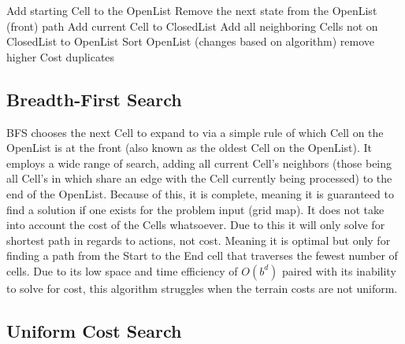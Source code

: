 \documentclass[conference]{IEEEtran}
\begin{document}
\begin{algorithm}
\caption{General Search Outline}
\begin{algorithmic}[1]
\State Add starting Cell to the OpenList
    \State Remove the next state from the OpenList (front)
        \State \Return path
    \Else
        \State Add current Cell to ClosedList
        \State Add all neighboring Cells not on ClosedList to OpenList
    \EndIf
        \State Sort OpenList (changes based on algorithm)
        \State remove higher Cost duplicates
    \EndIf
\EndWhile
\end{algorithmic}
\end{algorithm}

\subsection{Breadth-First Search}
BFS chooses the next Cell to expand to via a simple rule of which Cell on the OpenList is at the front (also known as the oldest Cell on the OpenList). It employs a wide range of search, adding all current Cell's neighbors (those being all Cell's in which share an edge with the Cell currently being processed) to the end of the OpenList. Because of this, it is complete, meaning it is guaranteed to find a solution if one exists for the problem input (grid map). It does not take into account the cost of the Cells whatsoever. Due to this it will only solve for shortest path in regards to actions, not cost. Meaning it is optimal but only for finding a path from the Start to the End cell that traverses the fewest number of cells. Due to its low space and time efficiency of $O(b^d)$ paired with its inability to solve for cost, this algorithm struggles when the terrain costs are not uniform.

\subsection{Uniform Cost Search}
\end{document}
